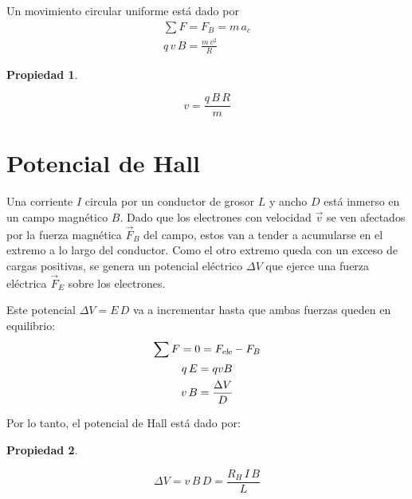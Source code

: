 \documentclass[a5paper,12pt,twoside]{book}
\newtheorem{prop}{{Propiedad}}[chapter]
\begin{document}
Un movimiento circular uniforme está dado por
\begin{gather*}
    \sum F = F_B = m \, a_c
    \\
    q \, v \, B = \frac{m \, v^2}{R}
\end{gather*}

\begin{mdframed}[style=MyFrame1]
    \begin{prop}
    \end{prop}
    \begin{equation*}
        v = \frac{q \, B \, R}{m}
    \end{equation*}
\end{mdframed}


\section{Potencial de Hall}

Una corriente $I$ circula por un conductor de grosor $L$ y ancho $D$ está inmerso en un campo magnético $B$. Dado que los electrones con velocidad $\Vec{v}$ se ven afectados por la fuerza magnética $\Vec{F}_B$ del campo, estos van a tender a acumularse en el extremo a lo largo del conductor. Como el otro extremo queda con un exceso de cargas positivas, se genera un potencial eléctrico $\Delta V$ que ejerce una fuerza eléctrica $\Vec{F}_E$ sobre los electrones.

\begin{center}
    \def\svgwidth{0.8\linewidth}
    
\end{center}

Este potencial $\Delta V = E \, D$ va a incrementar hasta que ambas fuerzas queden en equilibrio:
\begin{gather*}
    \sum F = 0 = {{F}_\textsl{{ele}}} - F_B
    \\
    q \, E = qvB
    \\
    v \, B = \frac{\Delta V}{D}
\end{gather*}

Por lo tanto, el potencial de Hall está dado por:

\begin{mdframed}[style=MyFrame1]
    \begin{prop}
    \end{prop}
    \begin{equation*}
        \Delta V = v \, B \, D = \frac{R_H \, I \, B}{L}
    \end{equation*}
\end{mdframed}
\end{document}
